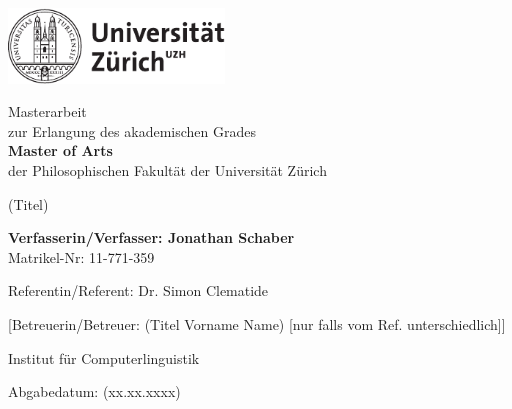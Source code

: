 \begin{titlepage}
\includegraphics[height=20mm]{images/uzh_logo_d_pos}\\

\begin{center}

{\sffamily
Masterarbeit \\
zur Erlangung des akademischen Grades \\
\textbf{Master of Arts} \\
der Philosophischen Fakultät der Universität Zürich \\

\vspace{2cm}

{\Huge (Titel)}\\

\vspace{4cm}

\textbf{Verfasserin/Verfasser: Jonathan Schaber} \\
	Matrikel-Nr: 11-771-359 \\

\vspace{2cm}

Referentin/Referent: Dr. Simon Clematide

[Betreuerin/Betreuer: (Titel Vorname Name) {\small [nur falls vom Ref. unterschiedlich]}]

Institut f\"ur Computerlinguistik

\vfill Abgabedatum: (xx.xx.xxxx)

\vspace{3cm}
}
\end{center}

\end{titlepage}

\newpage

